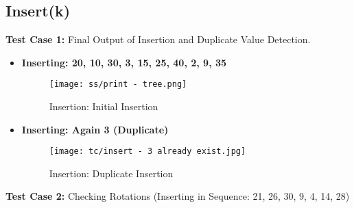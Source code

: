 \documentclass{article}
\begin{document}
\subsection{Insert(k)}
\textbf{Test Case 1:} Final Output of Insertion and Duplicate Value Detection.
\begin{itemize}
    \item \textbf{Inserting: 20, 10, 30, 3, 15, 25, 40, 2, 9, 35 }\newline
	    \begin{figure}[H]
            \centering
                \texttt{[image: ss/print - tree.png]}
            \caption{Insertion: Initial Insertion}
            \label{fig:Insert_Tree_initial}
        \end{figure}
    \item \textbf{Inserting: Again 3 (Duplicate) }\newline
	    \begin{figure}[H]
            \centering
                \texttt{[image: tc/insert - 3 already exist.jpg]}
            \caption{Insertion: Duplicate Insertion}
            \label{fig:Insert_Tree_duplicate}
        \end{figure}    
\end{itemize}
\textbf{Test Case 2:} Checking Rotations (Inserting in Sequence: 21, 26, 30, 9, 4, 14, 28)
\end{document}
